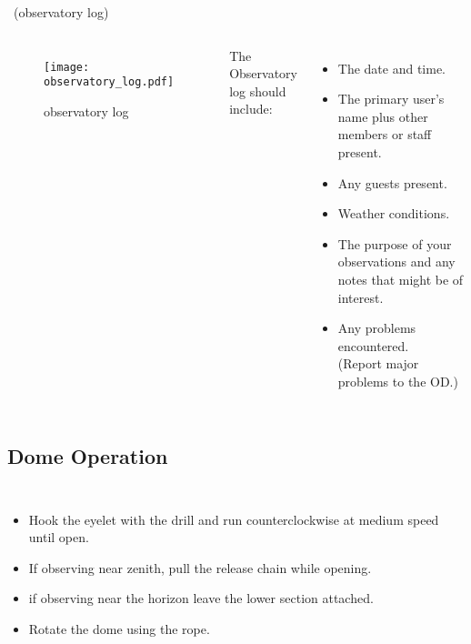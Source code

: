 \begin{frame}[t]{\insertsubsectionhead\ (observatory log)}
\begin{columns}[T]
    \begin{figure}[h]
        \texttt{[image: observatory\_log.pdf]}
      \caption{observatory log}
    \end{figure}

  {\Large
    The Observatory log should include:}
    \begin{itemize}
      \item The date and time.
      \item The primary user's name plus other members or staff present.
      \item Any guests present.
      \item Weather conditions.
      \item The purpose of your observations and any notes that might be of interest.
      \item Any problems encountered.\\
            (Report major problems to the OD.)
    \end{itemize}
\end{columns}
\end{frame}


\subsection{Dome Operation}

\begin{frame}[t]{\insertsubsectionhead}
  \begin{columns}[T]
    \centering
  
    \Large
      \begin{itemize}
        \item Hook the eyelet with the drill and run counterclockwise at
         medium speed until open.
        \item If observing near zenith, pull the release chain while opening.
        \item if observing near the horizon leave the lower section attached.
        \item Rotate the dome using the rope.
      \end{itemize}
  \end{columns}
  \end{frame}

